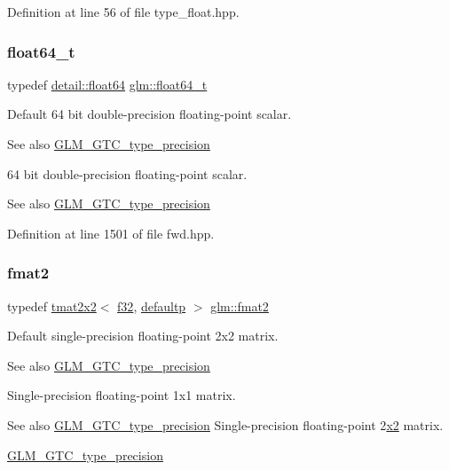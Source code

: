 Definition at line 56 of file type\+\_\+float.\+hpp.

\mbox{\label{group__gtc__type__precision_gade966a3eb25ebeb16dd53c40d3fdeb46}} 
\subsubsection{\texorpdfstring{float64\_t}{float64\_t}}
{\footnotesize\ttfamily typedef \mbox{\hyperlink{namespaceglm_1_1detail_a5a0a9a1be3fd5dbe6d47ae45c3022b06}{detail\+::float64}} \mbox{\hyperlink{group__gtc__type__precision_gade966a3eb25ebeb16dd53c40d3fdeb46}{glm\+::float64\+\_\+t}}}

Default 64 bit double-\/precision floating-\/point scalar. \begin{DoxySeeAlso}{See also}
\mbox{\hyperlink{group__gtc__type__precision}{G\+L\+M\+\_\+\+G\+T\+C\+\_\+type\+\_\+precision}}
\end{DoxySeeAlso}
64 bit double-\/precision floating-\/point scalar. \begin{DoxySeeAlso}{See also}
\mbox{\hyperlink{group__gtc__type__precision}{G\+L\+M\+\_\+\+G\+T\+C\+\_\+type\+\_\+precision}} 
\end{DoxySeeAlso}


Definition at line 1501 of file fwd.\+hpp.

\mbox{\label{group__gtc__type__precision_gab8e1ce0a2648cfcd645eed2d8ea96f21}} 
\subsubsection{\texorpdfstring{fmat2}{fmat2}}
{\footnotesize\ttfamily typedef \mbox{\hyperlink{structglm_1_1tmat2x2}{tmat2x2}}$<$ \mbox{\hyperlink{group__gtc__type__precision_ga0ec999b57f5330d9021256e96038df04}{f32}}, \mbox{\hyperlink{namespaceglm_a0f04f086094c747d227af4425893f545a9d21ccd8b5a009ec7eb7677befc3bf51}{defaultp}} $>$ \mbox{\hyperlink{group__gtc__type__precision_gab8e1ce0a2648cfcd645eed2d8ea96f21}{glm\+::fmat2}}}

Default single-\/precision floating-\/point 2x2 matrix. \begin{DoxySeeAlso}{See also}
\mbox{\hyperlink{group__gtc__type__precision}{G\+L\+M\+\_\+\+G\+T\+C\+\_\+type\+\_\+precision}}
\end{DoxySeeAlso}
Single-\/precision floating-\/point 1x1 matrix. \begin{DoxySeeAlso}{See also}
\mbox{\hyperlink{group__gtc__type__precision}{G\+L\+M\+\_\+\+G\+T\+C\+\_\+type\+\_\+precision}} Single-\/precision floating-\/point 2\mbox{\hyperlink{glad_8h_ad2cea6eadb01f017f0d57e7edf0ce988}{x2}} matrix. 

\mbox{\hyperlink{group__gtc__type__precision}{G\+L\+M\+\_\+\+G\+T\+C\+\_\+type\+\_\+precision}} 
\end{DoxySeeAlso}


